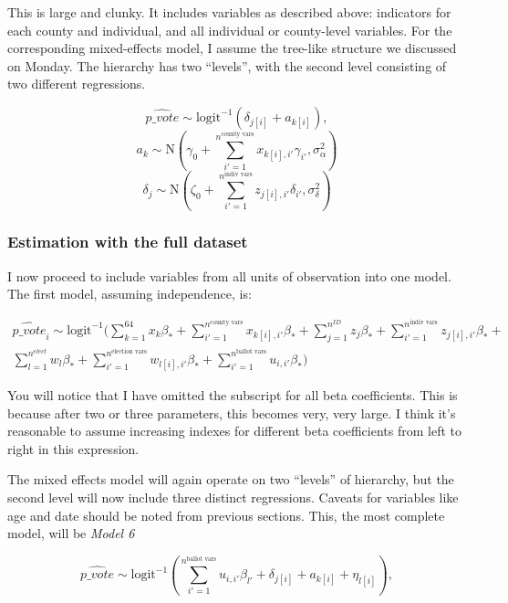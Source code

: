 \documentclass[12pt,twoside]{reedthesis}
\begin{document}
  This is large and clunky. It includes variables as described above:
  indicators for each county and individual, and all individual or
  county-level variables. For the corresponding mixed-effects model, I
  assume the tree-like structure we discussed on Monday. The hierarchy has
  two ``levels'', with the second level consisting of two different
  regressions.
  
  \[\hat{p\_vote} \sim \text{logit}^{-1}(\delta_{j[i]} + a_{k[i]}), \]
  \[a_{k} \sim \text{N}(\gamma_0 + \sum_{i'=1}^{n^{\text{county vars}}}x_{k[i], i'}\gamma_{i'}, \sigma_{\alpha}^2)\]
  \[\delta_{j} \sim \text{N}(\zeta_0 + \sum_{i'=1}^{n^{\text{indiv vars}}}z_{j[i], i'}\delta_{i'}, \sigma_{\delta}^2)\]
  
  \subsubsection{Estimation with the full
  dataset}\label{estimation-with-the-full-dataset}
  
  I now proceed to include variables from all units of observation into
  one model. The first model, assuming independence, is:
  
  \[
  \begin{aligned}
  \hat{p\_vote}_i \sim \text{logit}^{-1}(\sum_{k = 1}^{64}x_{k}\beta_{*} + \sum_{i'=1}^{n^{\text{county vars}}}x_{k[i], i'}\beta_{*} + \sum_{j = 1}^{n^{ID}}z_{j}\beta_{*} + \sum_{i'=1}^{n^{\text{indiv vars}}}z_{j[i], i'}\beta_{*} + \\
  \sum_{l = 1}^{n^{elect}}w_{l}\beta_{*} + \sum_{i'=1}^{n^{\text{election vars}}}w_{l[i], i'}\beta_{*} + \sum_{i' = 1}^{n^{\text{ballot vars}}}u_{i,i'}\beta_{*})
  \end{aligned}
  \]
  
  You will notice that I have omitted the subscript for all beta
  coefficients. This is because after two or three parameters, this
  becomes very, very large. I think it's reasonable to assume increasing
  indexes for different beta coefficients from left to right in this
  expression.
  
  The mixed effects model will again operate on two ``levels'' of
  hierarchy, but the second level will now include three distinct
  regressions. Caveats for variables like age and date should be noted
  from previous sections. This, the most complete model, will be
  \emph{Model 6}
  
  \[\hat{p\_vote} \sim \text{logit}^{-1}(\sum_{i' = 1}^{n^{\text{ballot vars}}}u_{i,i'}\beta_{l'} +\delta_{j[i]} + a_{k[i]} + \eta_{l[i]}),\]
  
\end{document}
